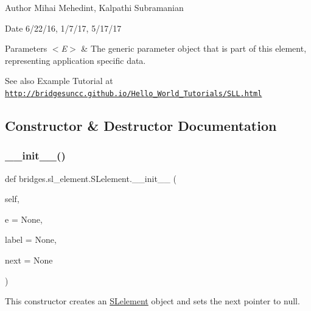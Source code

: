 \begin{DoxyAuthor}{Author}
Mihai Mehedint, Kalpathi Subramanian
\end{DoxyAuthor}
\begin{DoxyDate}{Date}
6/22/16, 1/7/17, 5/17/17
\end{DoxyDate}

\begin{DoxyParams}{Parameters}
{\em $<$\+E$>$} & The generic parameter object that is part of this element, representing application specific data.\\
\hline
\end{DoxyParams}
\begin{DoxySeeAlso}{See also}
Example Tutorial at ~\newline
 \href{http://bridgesuncc.github.io/Hello_World_Tutorials/SLL.html}{\tt http\+://bridgesuncc.\+github.\+io/\+Hello\+\_\+\+World\+\_\+\+Tutorials/\+S\+L\+L.\+html} 
\end{DoxySeeAlso}


\subsection{Constructor \& Destructor Documentation}
\mbox{\label{classbridges_1_1sl__element_1_1_s_lelement_ad2d298e03cbda62f6c8afac630179f16}} 
\subsubsection{\texorpdfstring{\+\_\+\+\_\+init\+\_\+\+\_\+()}{\_\_init\_\_()}}
{\footnotesize\ttfamily def bridges.\+sl\+\_\+element.\+S\+Lelement.\+\_\+\+\_\+init\+\_\+\+\_\+ (\begin{DoxyParamCaption}\item[{}]{self,  }\item[{}]{e = {\ttfamily None},  }\item[{}]{label = {\ttfamily None},  }\item[{}]{next = {\ttfamily None} }\end{DoxyParamCaption})}



This constructor creates an \mbox{\hyperlink{classbridges_1_1sl__element_1_1_s_lelement}{S\+Lelement}} object and sets the next pointer to null. 


